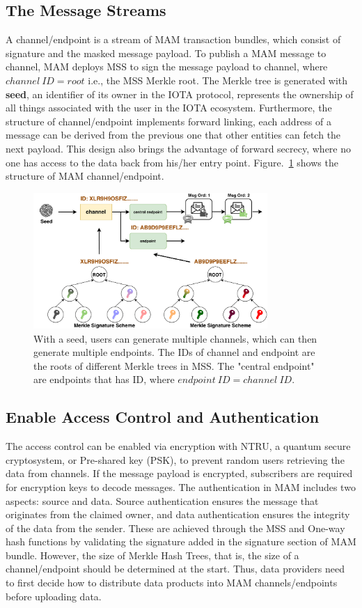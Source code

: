 \documentclass[conference]{IEEEtran}
\begin{document}
\subsection{The Message Streams}
A channel/endpoint is a stream of MAM transaction bundles, which consist of signature and the masked message payload. To publish a MAM message to channel, MAM deploys MSS to sign the message payload to channel, where $channel\ ID = root$ i.e., the MSS Merkle root. The Merkle tree is generated with \textbf{seed}, an identifier of its owner in the IOTA protocol, represents the ownership of all things associated with the user in the IOTA ecosystem. Furthermore, the structure of channel/endpoint implements forward linking, each address of a message can be derived from the previous one that other entities can fetch the next payload. This design also brings the advantage of forward secrecy, where no one has access to the data back from his/her entry point. Figure.~\ref{fig:mam_structure} shows the structure of MAM channel/endpoint. 

\begin{figure}[h]
    \centering
    \includegraphics[width=3.5in]{mam_structure}
    \caption{With a seed, users can generate multiple channels, which can then generate multiple endpoints. The IDs of channel and endpoint are the roots of different Merkle trees in MSS. The "central endpoint" are endpoints that has ID, where $endpoint\ ID = channel\ ID$.}
    \label{fig:mam_structure}
\end{figure}

\subsection{Enable Access Control and Authentication}
The access control can be enabled via encryption with NTRU\cite{NTRU}, a quantum secure cryptosystem, or Pre-shared key (PSK), to prevent random users retrieving the data from channels. If the message payload is encrypted, subscribers are required for encryption keys to decode messages. The authentication in MAM includes two aspects: source and data. Source authentication ensures the message that originates from the claimed owner, and data authentication ensures the integrity of the data from the sender. These are achieved through the MSS and One-way hash functions by validating the signature added in the signature section of MAM bundle. However, the size of Merkle Hash Trees, that is, the size of a channel/endpoint should be determined at the start. Thus, data providers need to first decide how to distribute data products into MAM channels/endpoints before uploading data. 
\end{document}
